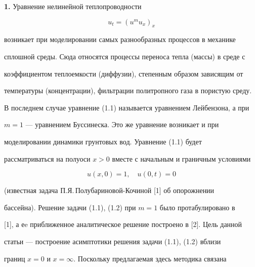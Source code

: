 \maketitle 


\label{begin} 


 


 


\setcounter{section}{1} 


 


 


{\bf 1.} Уравнение нелинейной теплопроводности 


\begin{equation} 


u_t=(u^m u_x)_x 


\end{equation} 


возникает при моделировании самых разнообразных процессов в механике 


сплошной среды. Сюда относятся процессы переноса тепла (массы) в среде с 


коэффициентом теплоемкости (диффузии), степенным образом зависящим от 


температуры (концентрации), фильтрации политропного газа в пористую среду. 


В последнем случае уравнение (1.1) называется уравнением Лейбензона, а при 


$m=1$ --- уравнением Буссинеска. Это же уравнение возникает и при 


моделировании динамики грунтовых вод. Уравнение (1.1) будет 


рассматриваться на полуоси $x>0$ вместе с начальным и граничным условиями 


\begin{equation} 


u(x,0)=1,\quad u(0,t)=0 


\end{equation} 


(известная задача П.Я.\,Полубариновой-Кочиной [1] об опорожнении 


бассейна). Решение задачи (1.1), (1.2) при $m=1$ было протабулировано в 


[1], а еe приближенное аналитическое решение построено в [2]. Цель данной 


статьи --- построение асимптотики решения задачи (1.1), (1.2) вблизи 


границ $x=0$ и $x=\infty$. Поскольку предлагаемая здесь методика связана 


